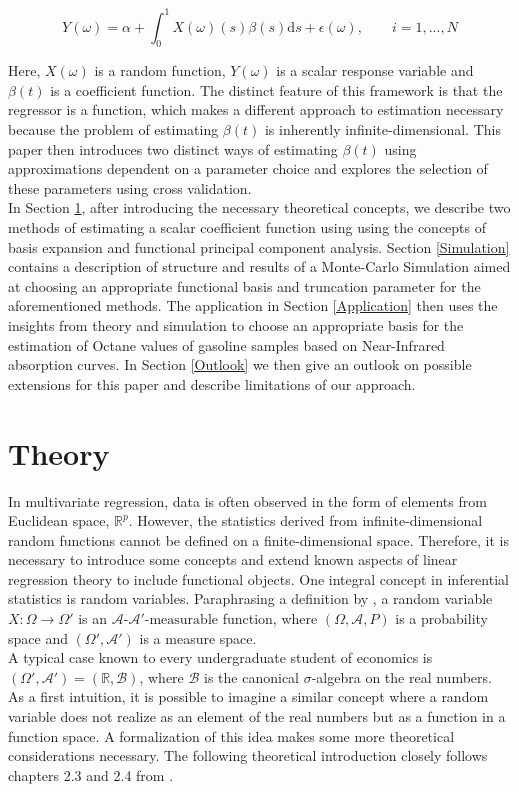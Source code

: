 \documentclass[11pt,twoside,a4paper]{article}
\begin{document}
	 \begin{equation}\label{DGP1}
	 	Y(\omega) = \alpha + \int_{0}^{1}{X(\omega)(s)\beta(s) \mathrm{d}s} + \epsilon(\omega),
	 	\qquad i = 1, ..., N
	 \end{equation}
 
	Here, $X(\omega)$ is a random function, $Y(\omega)$ is a scalar response variable and $\beta(t)$ is a coefficient function. The distinct feature of this framework is that the regressor is a function, which makes a different approach to estimation necessary because the problem of estimating $\beta(t)$ is inherently infinite-dimensional. This paper then introduces two distinct ways of estimating $\beta(t)$ using approximations dependent on a parameter choice and explores the selection of these parameters using cross validation.\\
		 
	In Section \ref{Theory}, after introducing the necessary theoretical concepts, we describe two methods of estimating a scalar coefficient function using using the concepts of basis expansion and functional principal component analysis. Section \ref{Simulation} contains a description of structure and results of a Monte-Carlo Simulation aimed at choosing an appropriate functional basis and truncation parameter for the aforementioned methods. The application in Section \ref{Application} then uses the insights from theory and simulation to choose an appropriate basis for the estimation of Octane values of gasoline samples based on Near-Infrared absorption curves. In Section \ref{Outlook} we then give an outlook on possible extensions for this paper and describe limitations of our approach.

	\section{Theory}\label{Theory}
	In multivariate regression, data is often observed in the form of elements from Euclidean space, $\mathbb{R}^p$. However, the statistics derived from infinite-dimensional random functions cannot be defined on a finite-dimensional space. Therefore, it is necessary to introduce some concepts and extend known aspects of linear regression theory to include functional objects. One integral concept in inferential statistics is random variables. Paraphrasing a definition by \cite{bauer_wahrscheinlichkeitstheorie_2020}, a random variable $X:\Omega \rightarrow \Omega'$ is an $\mathcal{A} \text{-} \mathcal{A'} \text{-measurable}$ function, where $(\Omega, \mathcal{A}, P)$ is a probability space and $(\Omega', \mathcal{A'})$ is a measure space.\\
	A typical case known to every undergraduate student of economics is $(\Omega', \mathcal{A'}) = (\mathbb{R}, \mathcal{B})$, where $\mathcal{B}$ is the canonical $\sigma$-algebra on the real numbers. As a first intuition, it is possible to imagine a similar concept where a random variable does not realize as an element of the real numbers but as a function in a function space. A formalization of this idea makes some more theoretical considerations necessary. The following theoretical introduction closely follows chapters 2.3 and 2.4 from \cite{hsing_theoretical_2015}. 
	
\end{document}
